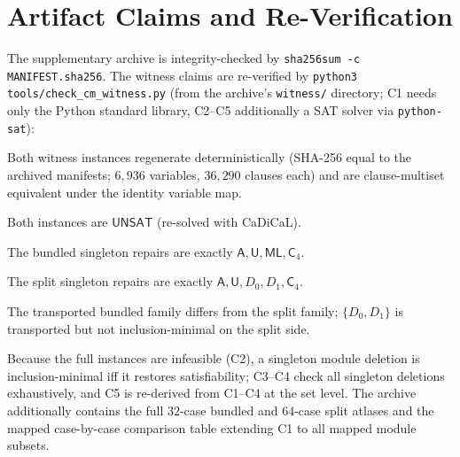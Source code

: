 \documentclass[sigplan,10pt,review,anonymous,nonacm]{acmart}
\theoremstyle{acmdefinition}
\newcommand{\code}[1]{\texttt{#1}}
\newcommand{\UNSAT}{\mathsf{UNSAT}}
\newcommand{\ML}{\mathsf{ML}}
\newcommand{\modsym}[1]{\mathsf{#1}}
\begin{document}
\section{Artifact Claims and Re-Verification}
\label{app:artifact}

The supplementary archive is integrity-checked by
\code{sha256sum -c MANIFEST.sha256}. The witness claims are re-verified by
\code{python3 tools/check\_cm\_witness.py} (from the archive's
\code{witness/} directory; C1 needs only the Python standard library, C2--C5
additionally a SAT solver via \code{python-sat}):

\begin{description}[leftmargin=1.4em]
\item[C1] Both witness instances regenerate deterministically (SHA-256 equal
to the archived manifests; $6{,}936$ variables, $36{,}290$ clauses each) and
are clause-multiset equivalent under the identity variable map.
\item[C2] Both instances are $\UNSAT$ (re-solved with CaDiCaL).
\item[C3] The bundled singleton repairs are exactly
$\modsym{A},\modsym{U},\ML,\mathsf{C}_4$.
\item[C4] The split singleton repairs are exactly
$\modsym{A},\modsym{U},D_0,D_1,\mathsf{C}_4$.
\item[C5] The transported bundled family differs from the split family;
$\{D_0, D_1\}$ is transported but not inclusion-minimal on the split side.
\end{description}

Because the full instances are infeasible (C2), a singleton module deletion
is inclusion-minimal iff it restores satisfiability; C3--C4 check all
singleton deletions exhaustively, and C5 is re-derived from C1--C4 at the set
level. The archive additionally contains the full $32$-case bundled and
$64$-case split atlases and the mapped case-by-case comparison table
extending C1 to all mapped module subsets.



\end{document}
